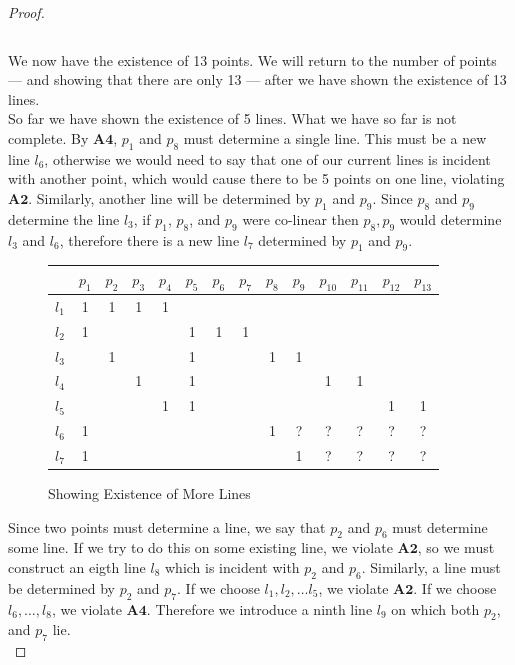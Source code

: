 \documentclass{article}
\begin{document}
\begin{proof}
\begin{figure}[h]
\begin{center}
\begin{tabular}{ c|c|c|c|c|c|c|c|c|c|c|c|c|c }
\end{tabular}
\end{center}
\end{figure}
We now have the existence of 13 points. We will return to the number of points --- and showing that there are only 13 --- after we have shown the existence of 13 lines. \\

So far we have shown the existence of 5 lines. What we have so far is not complete. By $\mathbf{A4}$, $p_1$ and $p_8$ must determine a single line. This must be a new line $l_6$, otherwise we would need to say that one of our current lines is incident with another point, which would cause there to be 5 points on one line, violating $\mathbf{A2}$. Similarly, another line will be determined by $p_1$ and $p_9$. Since $p_8$ and $p_9$ determine the line $l_3$, if $p_1$, $p_8$, and $p_9$ were co-linear then $p_8, p_9$ would determine $l_3$ and $l_6$, therefore there is a new line $l_7$ determined by $p_1$ and $p_9$.

\begin{figure}[h]
\caption{Showing Existence of More Lines}
\begin{center}
\begin{tabular}{ c|c|c|c|c|c|c|c|c|c|c|c|c|c } 
  & $p_1$ & $p_2$ & $p_3$ &$p_4$ &$p_5$ &$p_6$ &$p_7$ &$p_8$ &$p_9$  &$p_{10}$&$p_{11}$&$p_{12}$&$p_{13}$ \\ 
\hline
 $l_1$ & 1 & 1 & 1 & 1 &  &&& &&&&& \\ 
 \hline
 $l_2$ & 1 & &&&1&1&1&&&&&& \\
 \hline
 $l_3$ & &1&&&1&&&1&1&&&&\\
 \hline
 $l_4$ &  &  & 1 &  &1 & &&&&1&1&&\\
 \hline
 $l_5$ & &&&1&1&&&&&&&1&1\\
 \hline
 $l_6$ &1&&&&&&&1&?&?&?&?&? \\
 \hline
 $l_7$ &1&&&&&&&&1&?&?&?&?\\
 \end{tabular}
 \end{center}
 \end{figure}
Since two points must determine a line, we say that $p_2$ and $p_6$ must determine some line. If we try to do this on some existing line, we violate $\mathbf{A2}$, so we must construct an eigth line $l_8$ which is incident with $p_2$ and $p_6$. Similarly, a line must be determined by $p_2$ and $p_7$. If we choose $l_1, l_2, \dots l_5$, we violate $\mathbf{A2}$. If we choose $l_6, \dots, l_8$, we violate $\mathbf{A4}$. Therefore we introduce a ninth line $l_9$ on which both $p_2$, and $p_7$ lie. \\


\end{proof}
\end{document}
